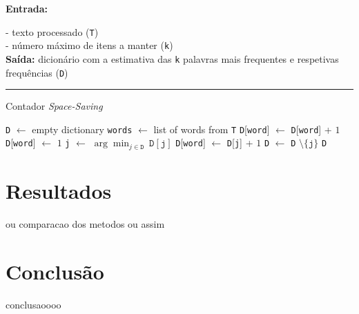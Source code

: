 \documentclass[mirror, portugues]{revdetua}
\begin{document}
\begin{algorithm}[H]
\raggedright
\textbf{Entrada:}

- texto processado (\texttt{T}) \\

- número máximo de itens a manter (\texttt{k}) \\

\textbf{Saída:} dicionário com a estimativa das \texttt{k} palavras mais frequentes e respetivas frequências (\texttt{D}) \\
\hrule 
\caption{Contador \textit{Space-Saving}}
\begin{algorithmic}[1]
    \State \texttt{D} $\gets$ empty dictionary
    \State \texttt{words} $\gets$ list of words from \texttt{T}
            \State \texttt{D}[\texttt{word}] $\gets$ \texttt{D}[\texttt{word}] + $1$
            \State \texttt{D}[\texttt{word}] $\gets$ $1$
        \Else
            \State \texttt{j} $\gets$ $\arg \min_{j \in \texttt{D}}\ \texttt{D}[\texttt{j}]$
            \State \texttt{D}[\texttt{word}] $\gets$ \texttt{D}[\texttt{j}] + $1$
            \State \texttt{D} $\gets$ \texttt{D} $\setminus \{\texttt{j}\}$
        \EndIf
    \EndFor
    \State \Return \texttt{D}
\end{algorithmic}
\end{algorithm}

\section{Resultados}

ou comparacao dos metodos ou assim




\section{Conclusão}

conclusaoooo


\end{document}
